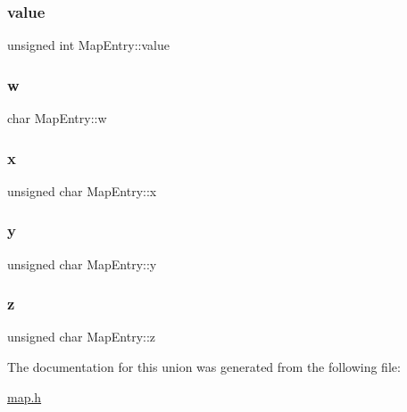 \subsubsection{\texorpdfstring{value}{value}}
{\footnotesize\ttfamily unsigned int Map\+Entry\+::value}

\mbox{\label{unionMapEntry_a95795e5a3f7c18129e5839d26b8b7167}} 
\subsubsection{\texorpdfstring{w}{w}}
{\footnotesize\ttfamily char Map\+Entry\+::w}

\mbox{\label{unionMapEntry_a2ce48990b14ea63b8b166c044a845902}} 
\subsubsection{\texorpdfstring{x}{x}}
{\footnotesize\ttfamily unsigned char Map\+Entry\+::x}

\mbox{\label{unionMapEntry_a3cb395be05afd1381c3f5d862a2218d3}} 
\subsubsection{\texorpdfstring{y}{y}}
{\footnotesize\ttfamily unsigned char Map\+Entry\+::y}

\mbox{\label{unionMapEntry_aeebe1190e2585cd8bbdd32b3faf590cd}} 
\subsubsection{\texorpdfstring{z}{z}}
{\footnotesize\ttfamily unsigned char Map\+Entry\+::z}



The documentation for this union was generated from the following file\+:\begin{DoxyCompactItemize}
\item 
\hyperlink{map_8h}{map.\+h}\end{DoxyCompactItemize}
